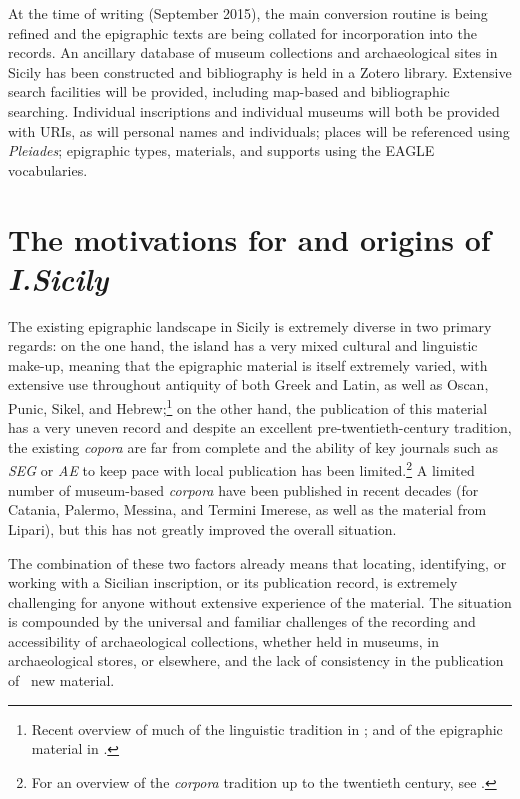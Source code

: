 \documentclass[amsthm,ebook]{saparticle}
\begin{document}
At the time of writing (September 2015), the main conversion routine is being refined and the epigraphic texts are being
collated for incorporation into the records. An ancillary database of museum collections and archaeological sites in Sicily has been constructed
and bibliography is held in a Zotero library. Extensive search facilities will be provided, including map-based and
bibliographic searching. Individual inscriptions and individual museums will both be provided with URIs, as will
personal names and individuals; places will be referenced using \emph{Pleiades}; epigraphic types, materials, and supports
using the EAGLE vocabularies.

\section{The motivations for and origins of \emph{I.Sicily}}
\noindent The existing epigraphic landscape in Sicily is extremely diverse in two primary regards: on the one hand, the island has
a very mixed cultural and linguistic make-up, meaning that the epigraphic material is itself extremely varied, with
extensive use throughout antiquity of both Greek and Latin, as well as Oscan, Punic, Sikel, and Hebrew;\footnote{
Recent overview of much of the linguistic tradition in \citet{tribulato_language_2012}; and of the epigraphic material in \citet{gulletta_sicilia_1999}.} on the other hand, the publication of this material has a very uneven record and despite an excellent
pre-twentieth-century tradition, the existing \emph{copora} are far from complete and the ability of key journals such as \emph{SEG}
or \emph{AE} to keep pace with local publication has been limited.\footnote{ For an overview of the \emph{corpora} tradition up to
the twentieth century, see \citet{de_vido_corpora_1999}.} A limited number of museum-based \emph{corpora} have been published in recent
decades (for Catania, Palermo, Messina, and Termini Imerese, as well as the material from Lipari), but this has not
greatly improved the overall situation.

The combination of these two factors already means that locating, identifying, or working with a Sicilian inscription,
or its publication record, is extremely challenging for anyone without extensive experience of the material. The
situation is compounded by the universal and familiar challenges of the recording and accessibility of archaeological
collections, whether held in museums, in archaeological stores, or elsewhere, and the lack of consistency in the
publication of \ new material.
\end{document}
